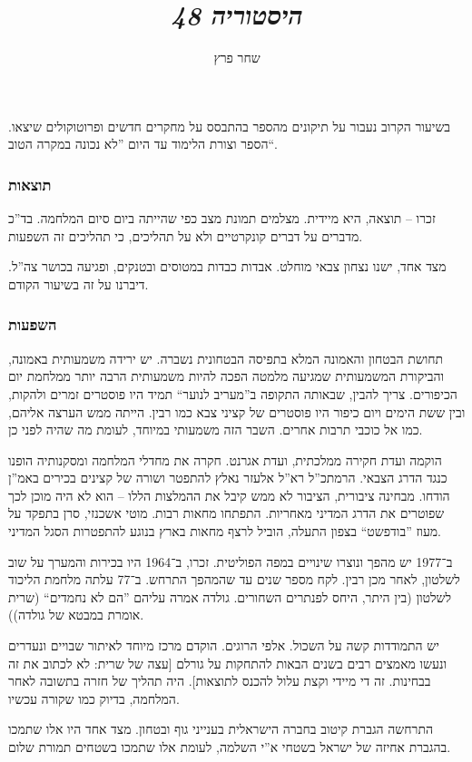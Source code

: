 \documentclass[]{../../../../tex/classes/styledArticle}
\author{שחר פרץ}
\title{\textit{היסטוריה 48}}
\begin{document}
	\maketitle
	בשיעור הקרוב נעבור על תיקונים מהספר בהתבסס על מחקרים חדשים ופרוטוקולים שיצאו. הספר וצורת הלימוד עד היום ''לא נכונה במקרה הטוב``. 
	
	\subsubsection*{תוצאות}
	זכרו – תוצאה, היא מיידית. מצלמים תמונת מצב כפי שהייתה ביום סיום המלחמה. בד''כ מדברים על דברים קונקרטיים ולא על תהליכים, כי תהליכים זה השפעות. 
	
	מצד אחד, ישנו נצחון צבאי מוחלט. אבדות כבדות במטוסים ובטנקים, ופגיעה בכושר צה''ל. דיברנו על זה בשיעור הקודם. 
	
	\subsubsection*{השפעות}
	תחושת הבטחון והאמונה המלא בתפיסה הבטחונית נשברה. יש ירידה משמעותית באמונה, והביקורת המשמעותית שמגיעה מלמטה הפכה להיות משמעותית הרבה יותר ממלחמת יום הכיפורים. צריך להבין, שבאותה התקופה ב''מעריב לנוער`` תמיד היו פוסטרים זמרים ולהקות, ובין ששת הימים ויום כיפור היו פוסטרים של קציני צבא כמו רבין. הייתה ממש הערצה אליהם, כמו אל כוכבי תרבות אחרים. השבר הזה משמעותי במיוחד, לעומת מה שהיה לפני כן. 
	
	הוקמה ועדת חקירה ממלכתית, ועדת אגרנט. חקרה את מחדלי המלחמה ומסקנותיה הופנו כנגד הדרג הצבאי. הרמתכ''ל רא''ל אלעזר נאלץ להתפטר ושורה של קצינים בכירים באמ''ן הודחו. מבחינה ציבורית, הציבור לא ממש קיבל את ההמלצות הללו – הוא לא היה מוכן לכך שפוטרים את הדרג המדיני מאחריות. התפתחו מחאות רבות. מוטי אשכנזי, סרן בתפקד על מעוז ''בודפשט`` בצפון התעלה, הוביל לרצף מחאות בארץ בנוגע להתפטרות הסגל המדיני. 
	
	ב־1977 יש מהפך ונוצרו שינויים במפה הפוליטית. זכרו, ב־1964 היו בכירות והמערך על שוב לשלטון, לאחר מכן רבין. לקח מספר שנים עד שהמהפך התרחש. ב־77 עלתה מלחמת הליכוד לשלטון (בין היתר, היחס לפנתרים השחורים. גולדה אמרה עליהם ''הם לא נחמדים`` (שרית אומרת במבטא של גולדה)). 
	
	יש התמודדות קשה על השכול. אלפי הרוגים. הוקדם מרכז מיוחד לאיתור שבויים ונעדרים ונעשו מאמצים רבים בשנים הבאות להתחקות על גורלם [עצה של שרית: לא לכתוב את זה בבחינות. זה די מיידי וקצת עלול להכנס לתוצאות]. היה תהליך של חזרה בתשובה לאחר המלחמה, בדיוק כמו שקורה עכשיו. 
	
	התרחשה הגברת קיטוב בחברה הישראלית בענייני גוף ובטחון. מצד אחד היו אלו שתמכו בהגברת אחיזה של ישראל בשטחי א''י השלמה, לעומת אלו שתמכו בשטחים תמורת שלום. 
	
\end{document}
